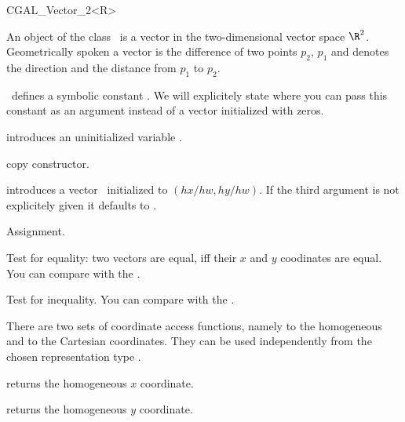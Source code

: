 
\begin{ccClassTemplate} {CGAL_Vector_2<R>}

\ccDefinition

An object of the class \ccClassName\ is a vector in the two-dimensional 
vector space $\R^2$. Geometrically spoken a vector is the difference
of two points $p_2$, $p_1$ and denotes the direction and the distance
from   $p_1$ to $p_2$. 

\cgal\ defines a symbolic constant . We 
will explicitely state where you can pass this constant as an argument
instead of a vector initialized with zeros.


\ccCreation
{}


\ccHidden{}
             {introduces an uninitialized variable \ccVar.}

\ccHidden {}
            {copy constructor.}

            {introduces a vector \ccVar\ initialized to $(hx/hw,hy/hw)$.
             If the third argument is not explicitely given it defaults
             to .}


\ccOperations
\ccSetTwoOfThreeColumns{5cm}{4cm}

\ccHidden {}
        {Assignment.}

       {Test for equality: two vectors are equal, iff their $x$ and $y$ 
        coodinates are equal. You can compare with the
        .}

       {Test for inequality. You can compare with the
        .}


There are two sets of coordinate access functions, namely to the
homogeneous and to the Cartesian coordinates. They can be used
independently from the chosen representation type .

       {returns the homogeneous $x$ coordinate.}

       {returns the homogeneous $y$ coordinate.}


\end{ccClassTemplate}
